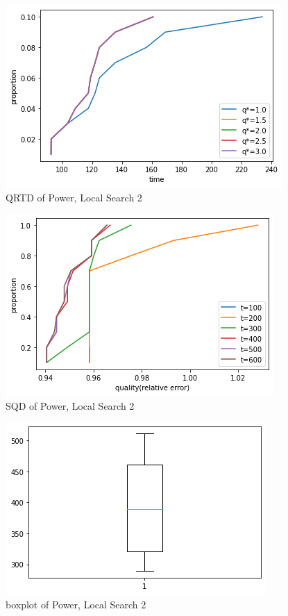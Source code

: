 \documentclass[acmlarge]{acmart}
\begin{document}
\begin{figure}[p]
	\includegraphics[width=\linewidth]{power_LS2_QRTD.png}
	\caption{QRTD of Power, Local Search 2}
\end{figure}


\begin{figure}[p]
	\includegraphics[width=\linewidth]{power_LS2_SQD.png}
	\caption{SQD of Power, Local Search 2}
\end{figure}

\begin{figure}[p]
	\includegraphics[width=\linewidth]{power_LS2_box.png}
	\caption{boxplot of Power, Local Search 2}
\end{figure}
\end{document}
